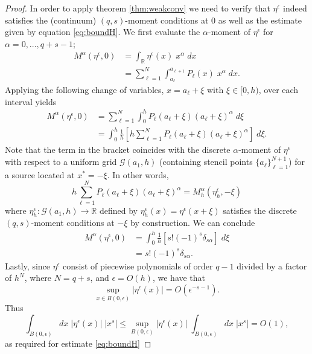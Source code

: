 \begin{proof}
	In order to apply theorem \ref{thm:weakconv} we need to verify that $\eta^\epsilon$ indeed satisfies the (continuum) $(q,s)$-moment conditions at $0$ as well as the estimate given by equation \ref{eq:boundH}.
	We first evaluate the $\alpha$-moment of $\eta^\epsilon$ for $\alpha=0,...,q+s-1$;
	\begin{subequations}
	\begin{align*}
		M^\alpha(\eta^\epsilon,0) &= \int_{\mathbb R} \eta^\epsilon(x) \;x^\alpha\; dx \\
			&= \sum_{\ell=1}^N \int_{a_\ell}^{a_{\ell+1}} P_\ell(x) \;x^\alpha \; dx.
	\end{align*}
	\end{subequations}
	Applying the following change of variables, $x= a_\ell + \xi$ with $\xi\in[0,h)$, over each interval yields
	\begin{subequations}
	\begin{align*}
		M^\alpha(\eta^\epsilon,0) &= \sum_{\ell=1}^N \int_{0}^h P_\ell(a_\ell+\xi) (a_\ell+\xi)^\alpha \; d\xi \\
			&= \int_{0}^h \frac{1}{h} \left[ h \sum_{\ell=1}^N P_\ell(a_\ell+\xi) (a_\ell+\xi)^\alpha \right]\; d\xi.
	\end{align*}
	\end{subequations}
	Note that the term in the bracket coincides with the discrete $\alpha$-moment of $\eta^\epsilon$ with respect to a uniform grid $\mathcal G(a_1,h)$ (containing stencil points $\{a_\ell\}_{\ell=1}^{N+1}$) for a source located at $x^*=-\xi$.
	In other words,
	\[
		h \sum_{\ell=1}^N P_\ell(a_\ell+\xi) (a_\ell+\xi)^\alpha = M_h^\alpha(\eta_h^\epsilon,-\xi)
	\]
	where $\eta_h^\epsilon:\mathcal G(a_1,h)\to \mathbb R$ defined by $\eta_h^\epsilon(x) = \eta^\epsilon(x+\xi)$ satisfies the discrete $(q,s)$-moment conditions at $-\xi$ by construction.
	We can conclude
	\begin{align*}
		M^\alpha(\eta^\epsilon,0) &= \int_{0}^h  \frac{1}{h} \left[ s! (-1)^{s} \delta_{s\alpha}\right]  \; d\xi \\
		&= s! (-1)^{s} \delta_{s\alpha}.
	\end{align*}
	Lastly, since $\eta^\epsilon$ consist of piecewise polynomials of order $q-1$ divided by a factor of $h^N$, where $N=q+s$, and $\epsilon=O(h)$, we have that
\[
	\sup_{x\in B(0,\epsilon)} |\eta^\epsilon(x)| = O(\epsilon^{-s-1}).
\] 
Thus
\[
	\int_{B(0,\epsilon)} dx\; |\eta^\epsilon(x)| \; |x^s| \le \sup_{B(0,\epsilon)} |\eta^\epsilon(x)|  \; \int_{B(0,\epsilon)} dx\; |x^s| = O(1),
\]
as required for estimate \ref{eq:boundH}

\end{proof}


